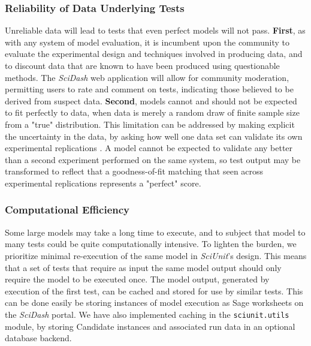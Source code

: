 \documentclass[11pt,letterpaper]{article}
\begin{document}
\subsubsection{Reliability of Data Underlying Tests}
Unreliable data will lead to tests that even perfect models will not pass. \textbf{First}, as with any system of model evaluation, it is incumbent upon the community to evaluate the experimental design and techniques involved in producing data, and to discount data that are known to have been produced using questionable methods.  The \textit{SciDash} web application will allow for community moderation, permitting users to rate and comment on tests, indicating those believed to be derived from suspect data.  \textbf{Second}, models cannot and should not be expected to fit perfectly to data, when data is merely a random draw of finite sample size from a "true" distribution.  This limitation can be addressed by making explicit the uncertainty in the data, by asking how well one data set can validate its own experimental replications \cite{kriegeskorte_representational_2008}.  A model cannot be expected to validate any better than a second experiment performed on the same system, so test output may be transformed to reflect that a goodness-of-fit matching that seen across experimental replications represents a "perfect" score.  

\subsubsection{Computational Efficiency}
Some large models may take a long time to execute, and to subject that model to many tests could be quite computationally intensive.  To lighten the burden, we prioritize minimal re-execution of the same model in \textit{SciUnit}'s design.  This means that a set of tests that require as input the same model output should only require the model to be executed once.  The model output, generated by execution of the first test, can be cached and stored for use by similar tests.  This can be done easily be storing instances of model execution as Sage worksheets on the \textit{SciDash} portal.  We have also implemented caching in the \verb|sciunit.utils| module, by storing Candidate instances and associated run data in an optional database backend.  
\end{document}
